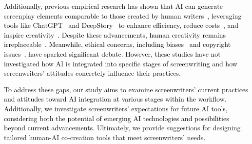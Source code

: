 \textcolor{black}{Additionally, previous empirical research has shown that AI can generate screenplay elements comparable to those created by human writers~\cite{ccelik4ai}, leveraging tools like ChatGPT~\cite{chatgpt, luchen2023chatgpt} and DeepStory~\cite{deepstory} to enhance efficiency, reduce costs~\cite{naji2024employing}, and inspire creativity~\cite{brako2023robots}. Despite these advancements, human creativity remains irreplaceable~\cite{naji2024employing, song2022analysis}. Meanwhile, ethical concerns, including biases~\cite{chow2020ghost} and copyright issues~\cite{kavitha2023copyright}, have sparked significant debate. However, these studies have not investigated how AI is integrated into specific stages of screenwriting and how screenwriters' attitudes concretely influence their practices.}


\textcolor{black}{To address these gaps, our study aims to examine screenwriters' current practices and attitudes toward AI integration at various stages within the workflow. Additionally, we investigate screenwriters’ expectations for future AI tools, considering both the potential of emerging AI technologies and possibilities beyond current advancements.} 
Ultimately, we provide suggestions for designing tailored human-AI co-creation tools that meet screenwriters' needs.


